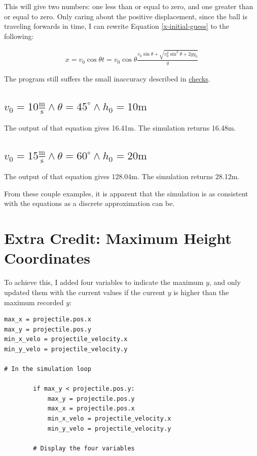 \documentclass[12pt]{article}
\begin{document}
This will give two numbers: one less than or equal to zero, and one greater than or equal to zero. Only caring about the positive displacement, since the ball is traveling forwards in time, I can rewrite Equation \ref{x-initial-guess} to the following:

\begin{align} \label{xt}
x = v_0\cos\theta t = v_0\cos\theta \frac{ v_0\sin\theta + \sqrt{v_0^2\sin^2\theta + 2gy_0}}{g}
\end{align}

The program still suffers the small inaccuracy described in \hyperref[sec:org43fcb29]{checks}.
\subsection{\(v_0 = 10 \frac{\text{m}}{\text{s}} \land \theta = 45 ^{\circ} \land h_0 = 10\text{m}\)}
\label{sec:org0856154}

The output of that equation gives 16.41m. The simulation returns 16.48m.
\subsection{\(v_0 = 15 \frac{\text{m}}{\text{s}} \land \theta = 60 ^{\circ} \land h_0 = 20\text{m}\)}
\label{sec:org14cdb7c}

The output of that equation gives 128.04m. The simulation returns 28.12m.

From these couple examples, it is apparent that the simulation is as consistent with the equations as a discrete approximation can be.
\section{Extra Credit: Maximum Height Coordinates}
\label{sec:org035d2bc}

To achieve this, I added four variables to indicate the maximum \(y\), and only updated them with the current values if the current \(y\) is higher than the maximum recorded \(y\):

\begin{verbatim}
max_x = projectile.pos.x
max_y = projectile.pos.y
min_x_velo = projectile_velocity.x
min_y_velo = projectile_velocity.y

# In the simulation loop

        if max_y < projectile.pos.y:
            max_y = projectile.pos.y
            max_x = projectile.pos.x
            min_x_velo = projectile_velocity.x
            min_y_velo = projectile_velocity.y

        # Display the four variables
\end{verbatim}
\end{document}
